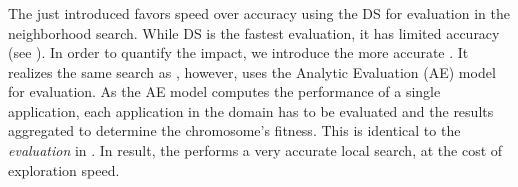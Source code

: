 \subsubsection{\gaana}

The just introduced \emph{\gads} favors speed over accuracy using the DS for evaluation in the neighborhood search. While DS is the fastest evaluation, it has limited accuracy (see ). In order to quantify the impact, we introduce the more accurate \emph{\gaana}. It realizes the same search as \emph{\gads}, however, uses the Analytic Evaluation (AE) model for evaluation. As the AE model computes the performance of a single application, each application in the domain has to be evaluated and the results aggregated to determine the chromosome's fitness. This is identical to the \emph{evaluation} in \emph{\garand}. In result, the \gaana performs a very accurate local search, at the cost of exploration speed. 